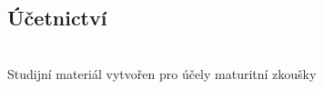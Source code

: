 \documentclass[../main.tex]{subfiles}
\begin{document}
\fontsize{10pt}{10pt}\selectfont\setlength\parindent{0em}
\pagestyle{empty}
\pagecolor{MPC}
\vspace{\fill}

\begin{center}
{\color{white}
\part{Účetnictví}
}
{\color{white}\LARGE \WSauthor}\\
\vspace*{1em}
{\color{white}\Large Studijní materiál vytvořen pro účely maturitní zkoušky}
\end{center}


\newpage
\pagecolor{white}

\blankpage

\newpage
\end{document}
